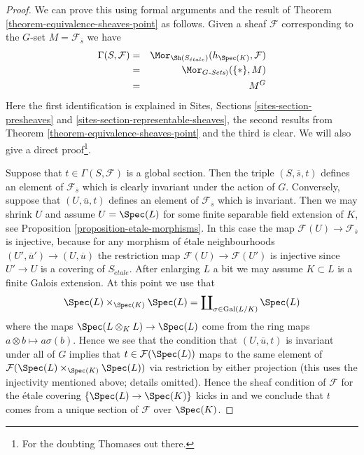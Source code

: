 \begin{proof}
We can prove this using formal arguments and the result of
Theorem \ref{theorem-equivalence-sheaves-point}
as follows. Given a sheaf $\mathcal{F}$ corresponding to
the $G$-set $M = \mathcal{F}_{\overline{s}}$ we have
\begin{eqnarray*}
\Gamma(S, \mathcal{F}) & = &
\Mor_{\Sh(S_{\acute{e}tale})}(h_{\Spec(K)},  \mathcal{F})
\\
& = & \Mor_{G\textit{-Sets})}(\{*\}, M) \\
& = & M^G
\end{eqnarray*}
Here the first identification is explained in
Sites, Sections \ref{sites-section-presheaves} and
\ref{sites-section-representable-sheaves},
the second results from
Theorem \ref{theorem-equivalence-sheaves-point}
and the third is clear. We will also give a direct proof\footnote{For
the doubting Thomases out there.}.

\medskip\noindent
Suppose that $t \in \Gamma(S, \mathcal{F})$ is a global section.
Then the triple $(S, \overline{s}, t)$ defines an element of
$\mathcal{F}_{\overline{s}}$ which is clearly invariant under the
action of $G$. Conversely, suppose that $(U, \overline{u}, t)$
defines an element of $\mathcal{F}_{\overline{s}}$ which is invariant.
Then we may shrink $U$ and assume $U = \Spec(L)$ for some
finite separable field extension of $K$, see
Proposition \ref{proposition-etale-morphisms}.
In this case the map $\mathcal{F}(U) \to \mathcal{F}_{\overline{s}}$
is injective, because for any morphism of \'etale neighbourhoods
$(U', \overline{u}') \to (U, \overline{u})$ the restriction map
$\mathcal{F}(U) \to \mathcal{F}(U')$ is injective since $U' \to U$
is a covering of $S_{\acute{e}tale}$.
After enlarging $L$ a bit we may assume $K \subset L$ is a finite
Galois extension. At this point we use that
$$
\Spec(L) \times_{\Spec(K)} \Spec(L)
=
\coprod\nolimits_{\sigma \in \text{Gal}(L/K)} \Spec(L)
$$
where the maps $\Spec(L \otimes_K L) \to \Spec(L)$
come from the ring maps $a \otimes b \mapsto a\sigma(b)$. Hence we
see that the condition that $(U, \overline{u}, t)$ is invariant
under all of $G$ implies that $t \in \mathcal{F}(\Spec(L))$
maps to the same element of
$\mathcal{F}(\Spec(L) \times_{\Spec(K)} \Spec(L))$
via restriction by either projection (this uses the injectivity mentioned
above; details omitted). Hence the sheaf condition of $\mathcal{F}$
for the \'etale covering $\{\Spec(L) \to \Spec(K)\}$ kicks
in and we conclude that $t$ comes from a unique section of $\mathcal{F}$
over $\Spec(K)$.
\end{proof}

